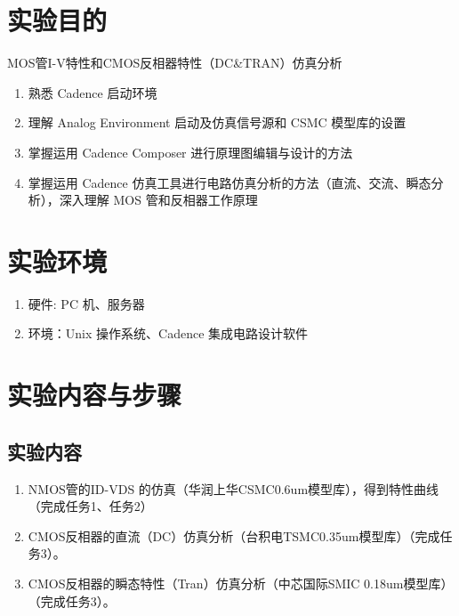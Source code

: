 \documentclass{theme-2614084}
\begin{document}

\makecover


\section{实验目的}

MOS管I-V特性和CMOS反相器特性（DC\&TRAN）仿真分析

\begin{enumerate}
  \item 熟悉 Cadence 启动环境
  \item 理解 Analog Environment 启动及仿真信号源和 CSMC 模型库的设置
  \item 掌握运用 Cadence Composer 进行原理图编辑与设计的方法
  \item 掌握运用 Cadence 仿真工具进行电路仿真分析的方法（直流、交流、瞬态分析），深入理解 MOS 管和反相器工作原理
\end{enumerate}

\section{实验环境}

\begin{enumerate}
  \item 硬件: PC 机、服务器
  \item 环境：Unix 操作系统、Cadence 集成电路设计软件
\end{enumerate}

\section{实验内容与步骤}


\subsection{实验内容}

\begin{enumerate}
  \item NMOS管的ID-VDS 的仿真（华润上华CSMC0.6um模型库），得到特性曲线（完成任务1、任务2）
  \item CMOS反相器的直流（DC）仿真分析（台积电TSMC0.35um模型库）（完成任务3）。
  \item CMOS反相器的瞬态特性（Tran）仿真分析（中芯国际SMIC 0.18um模型库）（完成任务3）。
\end{enumerate}
\end{document}

